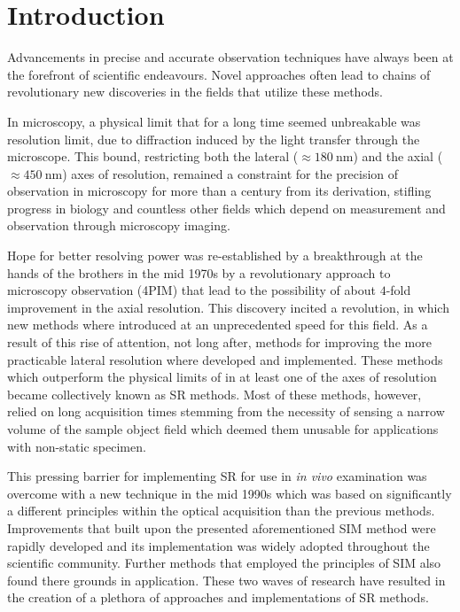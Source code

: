 \chapter*{Introduction\,\,}

Advancements in precise and accurate observation techniques have always been at the forefront of scientific endeavours.
Novel approaches often lead to chains of revolutionary new discoveries in the fields that utilize these methods.

In microscopy, a physical limit that for a long time seemed unbreakable was  resolution limit, due to
    diffraction induced by the light transfer through the microscope.
This bound, restricting both the lateral (\(\approx \qty{180}{\nano\meter}\)) and the axial 
    (\(\approx \qty{450}{\nano\meter}\)) axes of resolution, remained a constraint for the precision of observation in 
    microscopy for more than a century from its derivation, stifling progress in biology and countless other fields 
    which depend on measurement and observation through microscopy imaging.

Hope for better resolving power was re-established by a breakthrough at the hands of the  brothers in
    the mid 1970s by a revolutionary approach to microscopy observation (\acs{4PIM}) that lead to the possibility of 
    about \(4\)-fold improvement in the axial resolution.
This discovery incited a revolution, in which new methods where introduced at an unprecedented speed for this field.
As a result of this rise of attention, not long after, methods for improving the more practicable lateral resolution 
    where developed and implemented.
These methods which outperform the physical limits of  in at least one of the axes of resolution became 
    collectively known as \acf{SR} methods.
Most of these methods, however, relied on long acquisition times stemming from the necessity of sensing a narrow volume
    of the sample object field which deemed them unusable for applications with non-static specimen.

This pressing barrier for implementing \ac{SR} for use in \emph{in vivo} examination was overcome with a new technique 
    in the mid 1990s which was based on significantly a different principles within the optical acquisition than the
    previous methods.
Improvements that built upon the presented aforementioned \ac{SIM} method were rapidly developed and its implementation
    was widely adopted throughout the scientific community.
Further methods that employed the principles of \ac{SIM} also found there grounds in application.
These two waves of research have resulted in the creation of a plethora of approaches and implementations of \ac{SR} 
    methods.

